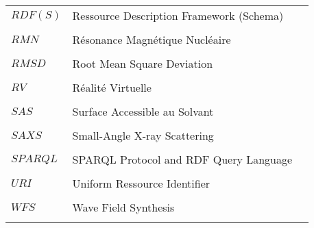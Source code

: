 \begin{table}[htbp]
\begin{tabular}{l l l}
$RDF(S)$ & Ressource Description Framework (Schema) & \\  \\
$RMN$ & Résonance Magnétique Nucléaire & \\  \\
$RMSD$ & Root Mean Square Deviation & \\  \\
$RV$ & Réalité Virtuelle & \\  \\
$SAS$ & Surface Accessible au Solvant & \\  \\
$SAXS$ & Small-Angle X-ray Scattering & \\  \\
$SPARQL$ & SPARQL Protocol and RDF Query Language \\  \\
$URI$ & Uniform Ressource Identifier \\  \\
$WFS$ & Wave Field Synthesis \\  \\

\end{tabular}
\end{table}

